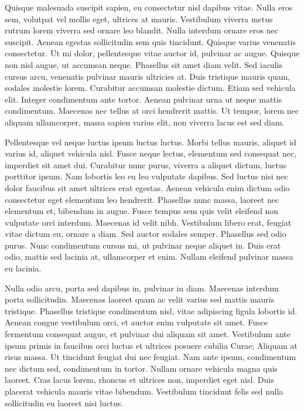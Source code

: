 Quisque malesuada suscipit sapien, eu consectetur nisl dapibus vitae.
Nulla eros sem, volutpat vel mollis eget, ultrices at mauris.
Vestibulum viverra metus rutrum lorem viverra sed ornare leo blandit.
Nulla interdum ornare eros nec suscipit.
Aenean egestas sollicitudin sem quis tincidunt.
Quisque varius venenatis consectetur.
Ut mi dolor, pellentesque vitae auctor id, pulvinar ac augue.
Quisque non nisl augue, ut accumsan neque.
Phasellus sit amet diam velit.
Sed iaculis cursus arcu, venenatis pulvinar mauris ultricies at.
Duis tristique mauris quam, sodales molestie lorem.
Curabitur accumsan molestie dictum.
Etiam sed vehicula elit.
Integer condimentum ante tortor.
Aenean pulvinar urna ut neque mattis condimentum.
Maecenas nec tellus at orci hendrerit mattis.
Ut tempor, lorem nec aliquam ullamcorper, massa sapien varius elit, non viverra lacus est sed diam.

Pellentesque vel neque luctus ipsum luctus luctus.
Morbi tellus mauris, aliquet id varius id, aliquet vehicula nisl.
Fusce neque lectus, elementum sed consequat nec, imperdiet sit amet dui.
Curabitur nunc purus, viverra a aliquet dictum, luctus porttitor ipsum.
Nam lobortis leo eu leo vulputate dapibus.
Sed luctus nisi nec dolor faucibus sit amet ultrices erat egestas.
Aenean vehicula enim dictum odio consectetur eget elementum leo hendrerit.
Phasellus nunc massa, laoreet nec elementum et, bibendum in augue.
Fusce tempus sem quis velit eleifend non vulputate orci interdum.
Maecenas id velit nibh.
Vestibulum libero erat, feugiat vitae dictum eu, ornare a diam.
Sed auctor sodales semper.
Phasellus sed odio purus.
Nunc condimentum cursus mi, ut pulvinar neque aliquet in.
Duis erat odio, mattis sed lacinia at, ullamcorper et enim.
Nullam eleifend pulvinar massa eu lacinia.

Nulla odio arcu, porta sed dapibus in, pulvinar in diam.
Maecenas interdum porta sollicitudin.
Maecenas laoreet quam ac velit varius sed mattis mauris tristique.
Phasellus tristique condimentum nisl, vitae adipiscing ligula lobortis id.
Aenean congue vestibulum orci, et auctor enim vulputate sit amet.
Fusce fermentum consequat augue, et pulvinar dui aliquam sit amet.
Vestibulum ante ipsum primis in faucibus orci luctus et ultrices posuere cubilia Curae; Aliquam at risus massa.
Ut tincidunt feugiat dui nec feugiat.
Nam ante ipsum, condimentum nec dictum sed, condimentum in tortor.
Nullam ornare vehicula magna quis laoreet.
Cras lacus lorem, rhoncus et ultrices non, imperdiet eget nisl.
Duis placerat vehicula mauris vitae bibendum.
Vestibulum tincidunt felis sed nulla sollicitudin eu laoreet nisi luctus.

